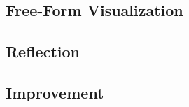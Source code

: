 \documentclass[a4paper,10pt]{article}
\begin{document}
\subsection{Free-Form Visualization}

\subsection{Reflection}

\subsection{Improvement}






\end{document}

